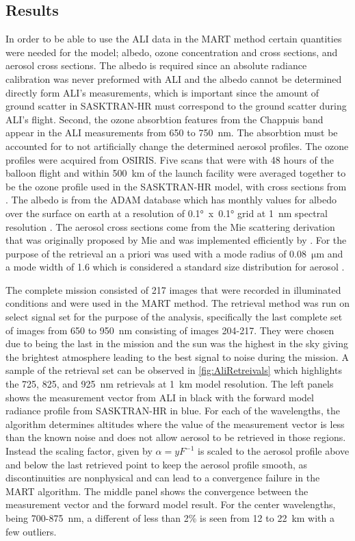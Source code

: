 \documentclass[12pt]{article}
\begin{document}
\subsection{Results}

In order to be able to use the ALI data in the MART method certain quantities were needed for the model; albedo, ozone concentration and cross sections, and aerosol cross sections. The albedo is required since an absolute radiance calibration was never preformed with ALI and the albedo cannot be determined directly form ALI's measurements, which is important since the amount of ground scatter in SASKTRAN-HR must correspond to the ground scatter during ALI's flight. Second, the ozone absorbtion features from the Chappuis band appear in the ALI measurements from 650 to 750~nm. The absorbtion must be accounted for to not artificially change the determined aerosol profiles. The ozone profiles were acquired from OSIRIS. Five scans that were with 48 hours of the balloon flight and  within 500~km of the launch facility were averaged together to be the ozone profile used in the SASKTRAN-HR model, with cross sections from \cite{Burrows1999}. The albedo is from the ADAM database which has monthly values for albedo over the surface on earth at a resolution of 0.1\si{\degree}~x~0.1\si{\degree} grid at 1~nm spectral resolution \citep{Muller2013}. The aerosol cross sections come from the Mie scattering derivation that was originally proposed by Mie and was implemented efficiently by \cite{Wiscombe1980}. For the purpose of the retrieval an a priori was used with a mode radius of 0.08~$\si{\micro\metre}$  and a mode width of 1.6 which is considered a standard size distribution for aerosol \citep{Deshler2003}.

The complete mission consisted of 217 images that were recorded in illuminated conditions and were used in the MART method. The retrieval method was run on select signal set for the purpose of the analysis, specifically the last complete set of images from 650 to 950~nm consisting of images 204-217. They were chosen due to being the last in the mission and the sun was the highest in the sky giving the brightest atmosphere leading to the best signal to noise during the mission. A sample of the retrieval set can be observed in \autoref{fig:AliRetreivals} which highlights the 725, 825, and 925~nm retrievals at 1~km model resolution. The left panels shows the measurement vector from ALI in black with the forward model radiance profile from SASKTRAN-HR in blue. For each of the wavelengths, the algorithm determines altitudes where the value of the measurement vector is less than the known noise and does not allow aerosol to be retrieved in those regions. Instead the scaling factor, given by $\alpha = yF^{-1}$ is scaled to the aerosol profile above and below the last retrieved point to keep the aerosol profile smooth, as discontinuities are nonphysical and can lead to a convergence failure in the MART algorithm. The middle panel shows the convergence between the measurement vector and the forward model result. For the center wavelengths, being 700-875~nm, a different of less than 2\% is seen from 12 to 22~km with a few outliers.
\end{document}
